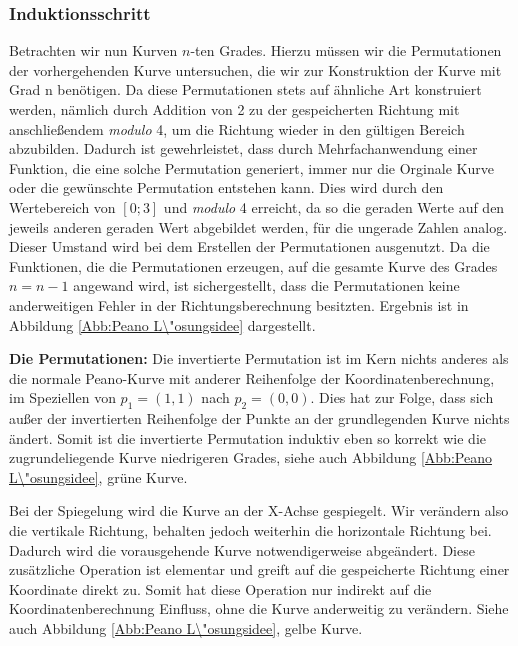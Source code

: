 \documentclass[course=asp]{aspdoc}
\begin{document}
\subsubsection{Induktionsschritt} \label{Induktionsschritt}
Betrachten wir nun Kurven $n$-ten Grades. Hierzu m\"ussen wir die Permutationen der vorhergehenden Kurve untersuchen, die wir zur Konstruktion der Kurve mit Grad n ben\"otigen.
Da diese Permutationen stets auf \"ahnliche Art konstruiert werden, n\"amlich durch Addition von 2 zu der gespeicherten Richtung mit anschlie\ss endem \textit{modulo} 4, um die Richtung wieder in den g\"ultigen Bereich abzubilden. Dadurch ist gewehrleistet, dass durch Mehrfachanwendung einer Funktion, die eine solche Permutation generiert, immer nur die Orginale Kurve oder die gew\"unschte Permutation entstehen kann. Dies wird durch den Wertebereich von $[0;3]$ und \textit{modulo} 4 erreicht, da so die geraden Werte auf den jeweils anderen geraden Wert abgebildet werden, f\"ur die ungerade Zahlen analog. Dieser Umstand wird bei dem Erstellen der Permutationen ausgenutzt.
Da die Funktionen, die die Permutationen erzeugen, auf die gesamte Kurve des Grades $n = n - 1$ angewand wird, ist sichergestellt, dass die Permutationen keine anderweitigen Fehler in der Richtungsberechnung besitzten. Ergebnis ist in Abbildung \ref{Abb:Peano L\"osungsidee} dargestellt.

\textbf{Die Permutationen: }%
Die invertierte Permutation ist im Kern nichts anderes als die normale Peano-Kurve mit anderer Reihenfolge der Koordinatenberechnung, im Speziellen von $p_1=(1,1)$ nach $p_2 = (0,0)$. Dies hat zur Folge, dass sich au\ss er der invertierten Reihenfolge der Punkte an der grundlegenden Kurve nichts \"andert. Somit ist die invertierte Permutation induktiv eben so korrekt wie die zugrundeliegende Kurve niedrigeren Grades, siehe auch Abbildung \ref{Abb:Peano L\"osungsidee}, gr\"une Kurve.

Bei der Spiegelung wird die Kurve an der X-Achse gespiegelt. Wir ver\"andern also die vertikale Richtung, behalten jedoch weiterhin die horizontale Richtung bei. Dadurch wird die vorausgehende Kurve notwendigerweise abge\"andert. Diese zus\"atzliche Operation ist elementar und greift auf die gespeicherte Richtung einer Koordinate direkt zu. Somit hat diese Operation nur indirekt auf die Koordinatenberechnung Einfluss, ohne die Kurve anderweitig zu ver\"andern. Siehe auch Abbildung \ref{Abb:Peano L\"osungsidee}, gelbe Kurve. %
\end{document}
